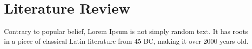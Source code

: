 \documentclass[../main.tex]{subfiles}
\begin{document}
 
\chapter{Literature Review}
Contrary to popular belief, Lorem Ipsum is not simply random text. It has roots in a piece of classical Latin literature from 45 BC, making it over 2000 years old. \cite{Bellows1983}
 
\end{document}
